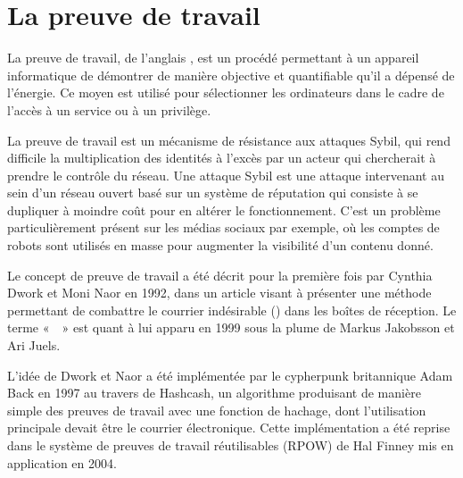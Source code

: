 

\section*{La preuve de travail}


La preuve de travail, de l'anglais , est un procédé permettant à un appareil informatique de démontrer de manière objective et quantifiable qu'il a dépensé de l'énergie. Ce moyen est utilisé pour sélectionner les ordinateurs dans le cadre de l'accès à un service ou à un privilège.

La preuve de travail est un mécanisme de résistance aux attaques Sybil, qui rend difficile la multiplication des identités à l'excès par un acteur qui chercherait à prendre le contrôle du réseau. Une attaque Sybil est une attaque intervenant au sein d'un réseau ouvert basé sur un système de réputation qui consiste à se dupliquer à moindre coût pour en altérer le fonctionnement. C'est un problème particulièrement présent sur les médias sociaux par exemple, où les comptes de robots sont utilisés en masse pour augmenter la visibilité d'un contenu donné. %

Le concept de preuve de travail a été décrit pour la première fois par Cynthia Dwork et Moni Naor en 1992, dans un article visant à présenter une méthode permettant de combattre le courrier indésirable () dans les boîtes de réception. Le terme «~~» est quant à lui apparu en 1999 sous la plume de Markus Jakobsson et Ari Juels.

L'idée de Dwork et Naor a été implémentée par le cypherpunk britannique Adam Back en 1997 au travers de Hashcash, un algorithme produisant de manière simple des preuves de travail avec une fonction de hachage, dont l'utilisation principale devait être le courrier électronique. Cette implémentation a été reprise dans le système de preuves de travail réutilisables (RPOW) de Hal Finney mis en application en 2004. %

